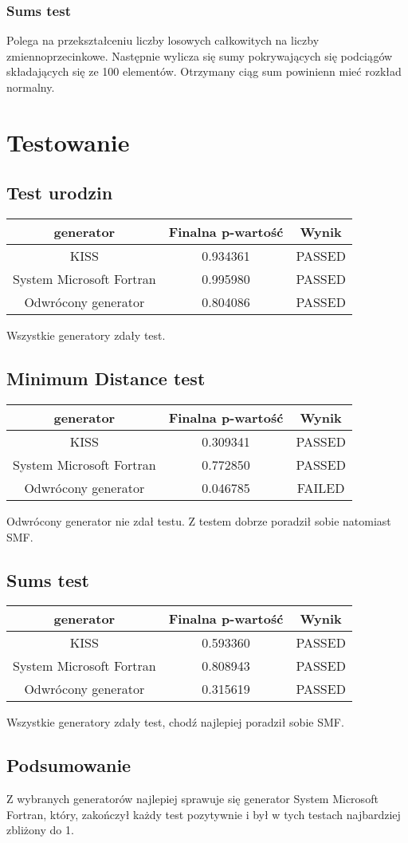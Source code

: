 \documentclass[11pt]{aghdpl}
\begin{document}
\subsubsection{Sums test}
Polega na przekształceniu liczby losowych całkowitych na liczby zmiennoprzecinkowe. Następnie wylicza się sumy pokrywających się podciągów składających się ze 100 elementów. Otrzymany ciąg sum powinienn mieć rozkład normalny.
\section{Testowanie}
\subsection{Test urodzin}
\begin{center}
\begin{tabular}{ccc}
generator & Finalna p-wartość & Wynik \\ \hline
KISS &  0.934361  & PASSED \\
System Microsoft Fortran & 0.995980 & PASSED \\
Odwrócony generator & 0.804086 & PASSED \\
\end{tabular}
\end{center}
Wszystkie generatory zdały test.
\subsection{Minimum Distance test}
\begin{center}
\begin{tabular}{ccc}
generator & Finalna p-wartość & Wynik \\ \hline
KISS &  0.309341  & PASSED \\
System Microsoft Fortran & 0.772850 & PASSED \\
Odwrócony generator & 0.046785 & FAILED \\
\end{tabular}
\end{center}
Odwrócony generator nie zdał testu. Z testem dobrze poradził sobie natomiast SMF.
\subsection{Sums test}
\begin{center}
\begin{tabular}{ccc}
generator & Finalna p-wartość & Wynik \\ \hline
KISS & 0.593360 & PASSED \\
System Microsoft Fortran & 0.808943 & PASSED \\
Odwrócony generator & 0.315619  & PASSED \\
\end{tabular}
\end{center}
Wszystkie generatory zdały test, chodź najlepiej poradził sobie SMF.
\subsection{Podsumowanie}
Z wybranych generatorów najlepiej sprawuje się generator System Microsoft Fortran, który, zakończył każdy test pozytywnie i był w tych testach najbardziej zbliżony do 1.
\end{document}
